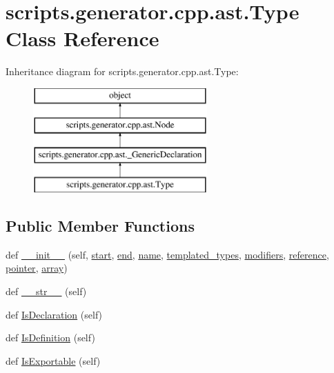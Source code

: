 \hypertarget{classscripts_1_1generator_1_1cpp_1_1ast_1_1_type}{}\section{scripts.\+generator.\+cpp.\+ast.\+Type Class Reference}
\label{classscripts_1_1generator_1_1cpp_1_1ast_1_1_type}
Inheritance diagram for scripts.\+generator.\+cpp.\+ast.\+Type\+:\begin{figure}[H]
\begin{center}
\leavevmode
\includegraphics[height=4.000000cm]{df/d50/classscripts_1_1generator_1_1cpp_1_1ast_1_1_type}
\end{center}
\end{figure}
\subsection*{Public Member Functions}
\begin{DoxyCompactItemize}
\item 
def \mbox{\hyperlink{classscripts_1_1generator_1_1cpp_1_1ast_1_1_type_a4b24fe1d4db182f8c8a7ba60f6bfbe47}{\+\_\+\+\_\+init\+\_\+\+\_\+}} (self, \mbox{\hyperlink{classscripts_1_1generator_1_1cpp_1_1ast_1_1_node_a27ce0a583baee598b75ac6dd21f8575b}{start}}, \mbox{\hyperlink{classscripts_1_1generator_1_1cpp_1_1ast_1_1_node_a8e3394f9dd405352610ff9be4f284e2c}{end}}, \mbox{\hyperlink{classscripts_1_1generator_1_1cpp_1_1ast_1_1_type_a9ede10095acabc77f8275f50017a3339}{name}}, \mbox{\hyperlink{classscripts_1_1generator_1_1cpp_1_1ast_1_1_type_a0c0032e5e17a59621b127c1c6ad27344}{templated\+\_\+types}}, \mbox{\hyperlink{classscripts_1_1generator_1_1cpp_1_1ast_1_1_type_a35a629285097cce5929aa6122fecdb0d}{modifiers}}, \mbox{\hyperlink{classscripts_1_1generator_1_1cpp_1_1ast_1_1_type_a6785886dc7046eeaa1189c4df7d79e19}{reference}}, \mbox{\hyperlink{classscripts_1_1generator_1_1cpp_1_1ast_1_1_type_aa3952c9220bb6110cafa7b802012600b}{pointer}}, \mbox{\hyperlink{classscripts_1_1generator_1_1cpp_1_1ast_1_1_type_ad31b043de2eaa2d48039c3bb32f15605}{array}})
\item 
def \mbox{\hyperlink{classscripts_1_1generator_1_1cpp_1_1ast_1_1_type_a15541ed15fd31658d8bd9f9a4984c662}{\+\_\+\+\_\+str\+\_\+\+\_\+}} (self)
\item 
def \mbox{\hyperlink{classscripts_1_1generator_1_1cpp_1_1ast_1_1_type_a91fb3784f75055327235157cdf98ea38}{Is\+Declaration}} (self)
\item 
def \mbox{\hyperlink{classscripts_1_1generator_1_1cpp_1_1ast_1_1_type_adb1f8318a4511dd75165f0b7fff9f588}{Is\+Definition}} (self)
\item 
def \mbox{\hyperlink{classscripts_1_1generator_1_1cpp_1_1ast_1_1_type_aa0c2d113f68d04b247025b9e2956a78c}{Is\+Exportable}} (self)
\end{DoxyCompactItemize}
